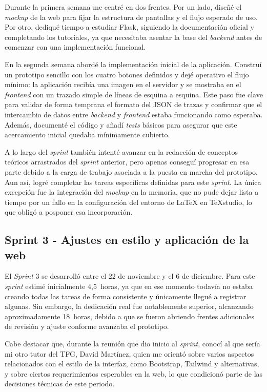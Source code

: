 Durante la primera semana me centré en dos frentes. Por un lado, diseñé el \textit{mockup} de la web para fijar la estructura de pantallas y el flujo esperado de uso. Por otro, dediqué tiempo a estudiar Flask, siguiendo la documentación oficial y completando los tutoriales, ya que necesitaba asentar la base del \textit{backend} antes de comenzar con una implementación funcional.

En la segunda semana abordé la implementación inicial de la aplicación. Construí un prototipo sencillo con los cuatro botones definidos y dejé operativo el flujo mínimo: la aplicación recibía una imagen en el servidor y se mostraba en el \textit{frontend} con un trazado simple de líneas de esquina a esquina. Este paso fue clave para validar de forma temprana el formato del JSON de trazas y confirmar que el intercambio de datos entre \textit{backend} y \textit{frontend} estaba funcionando como esperaba. Además, documenté el código y añadí \textit{tests} básicos para asegurar que este acercamiento inicial quedaba mínimamente cubierto.

A lo largo del \textit{sprint} también intenté avanzar en la redacción de conceptos teóricos arrastrados del \textit{sprint} anterior, pero apenas conseguí progresar en esa parte debido a la carga de trabajo asociada a la puesta en marcha del prototipo. Aun así, logré completar las tareas específicas definidas para este \textit{sprint}. La única excepción fue la integración del \textit{mockup} en la memoria, que no pude dejar lista a tiempo por un fallo en la configuración del entorno de \LaTeX{} en \TeX{}studio, lo que obligó a posponer esa incorporación.

\subsection{Sprint 3 - Ajustes en estilo y aplicación de la web}
El \textit{Sprint} 3 se desarrolló entre el 22 de noviembre y el 6 de diciembre. Para este \textit{sprint} estimé inicialmente 4,5~horas, ya que en ese momento todavía no estaba creando todas las tareas de forma consistente y únicamente llegué a registrar algunas. Sin embargo, la dedicación real fue notablemente superior, alcanzando aproximadamente 18~horas, debido a que se fueron abriendo frentes adicionales de revisión y ajuste conforme avanzaba el prototipo.

Cabe destacar que, durante la reunión que dio inicio al \textit{sprint}, conocí al que sería mi otro tutor del TFG, David Martínez, quien me orientó sobre varios aspectos relacionados con el estilo de la interfaz, como Bootstrap, Tailwind y alternativas, y sobre ciertos requerimientos esperables en la web, lo que condicionó parte de las decisiones técnicas de este periodo.

